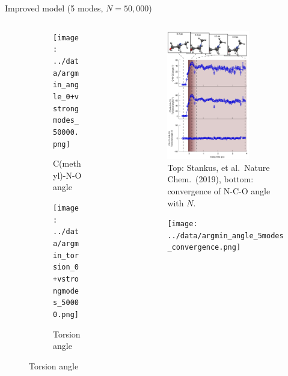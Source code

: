 \documentclass{beamer}
\begin{document}
\begin{frame}{Improved model (5 modes, $N=50{,}000$)}
\begin{columns}
\begin{column}{0.5\textwidth}
\begin{figure}
\begin{subfigure}[b]{\textwidth}
					\centering
					\texttt{[image: ../data/argmin\_angle\_0+vstrongmodes\_50000.png]}
					\caption{C(methyl)-N-O angle}
				\end{subfigure}
				\begin{subfigure}[b]{\textwidth}
					\centering
					\texttt{[image: ../data/argmin\_torsion\_0+vstrongmodes\_50000.png]}
					\caption{Torsion angle}
				\end{subfigure}
			\end{figure}
		\end{column}
		
		\begin{column}{0.5\textwidth}
			\vspace{-10mm}
			\begin{figure}[H]
				\centering
				\includegraphics[width=0.7\textwidth]{stankus_angle_plots.png}
				\caption{{\tiny Top: Stankus, et al.\ Nature Chem.\ (2019), bottom: convergence of N-C-O angle with $N$.}}
				\label{fig:nmm-geom}
			\end{figure}
		\vspace{-38mm}
			\begin{figure}[H]
			\centering
			\texttt{[image: ../data/argmin\_angle\_5modes\_convergence.png]}
			\text{}
		\end{figure}
		\end{column}
	\end{columns}
\end{frame}
\end{document}
